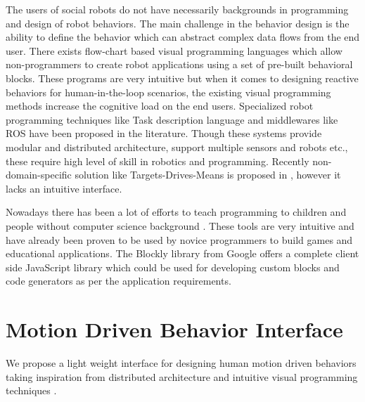 \documentclass{llncs}
\begin{document}
	The users of social robots do not have necessarily backgrounds in programming and design of robot behaviors. The main challenge in the behavior design is the ability to define the behavior which can abstract complex data flows from the end user. There exists flow-chart based visual programming languages \cite{NaoRobot} which allow non-programmers to create robot applications using a set of pre-built behavioral blocks. These programs are very intuitive but when it comes to designing reactive behaviors for human-in-the-loop scenarios, the existing visual programming methods increase the cognitive load on the end users. Specialized robot programming techniques like Task description language \cite{simmons1998task} and middlewares like ROS \cite{quigley2009ros} have been proposed in the literature. Though these systems provide modular and distributed architecture, support multiple sensors and robots etc., these require high level of skill in robotics and programming. Recently non-domain-specific solution like Targets-Drives-Means is proposed in \cite{berenz2014targets}, however it lacks an intuitive interface.
	
	Nowadays there has been a lot of efforts to teach programming to children and people without computer science background \cite{Scratch}\cite{Blockly}. These tools are very intuitive and have already been proven to be used by novice programmers to build games and educational applications. The Blockly library \cite{Blockly} from Google offers a complete client side JavaScript library which could be used for developing custom blocks and code generators as per the application requirements.
\section{Motion Driven Behavior Interface}
\quad We propose a light weight interface for designing human motion driven behaviors taking inspiration from distributed architecture \cite{quigley2009ros} and intuitive visual programming techniques \cite{Blockly}. 
\end{document}
